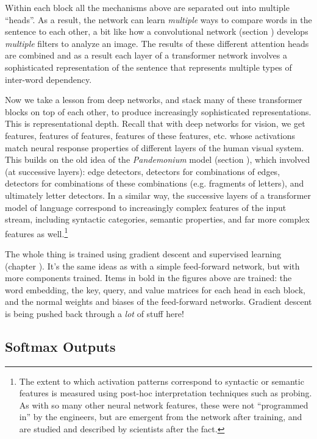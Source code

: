 Within each block all the mechanisms above are separated out into multiple ``heads''. As a result, the network can learn \emph{multiple} ways to compare words in the sentence to each other, a bit like how a convolutional network (section ) develops \emph{multiple} filters to analyze an image.  The results of these different attention heads are combined and as a result each layer of a transformer network involves a sophisticated representation of the sentence that represents multiple types of inter-word dependency.
 
Now we take a lesson from deep networks, and stack many of these transformer blocks on top of each other, to produce increasingly sophisticated representations. This is representational depth. Recall that with deep networks for vision, we get features, features of features, features of these features, etc. whose activations match neural response properties of different layers of the human visual system. This builds on the old idea of the \emph{Pandemonium} model (section ), which involved (at successive layers): edge detectors, detectors for combinations of edges, detectors for combinations of these combinations (e.g. fragments of letters), and ultimately letter detectors. In a similar way, the successive layers of a transformer model of language correspond to increasingly complex features of the input stream, including syntactic categories, semantic properties, and far more complex features as well.\footnote{The extent to which activation patterns correspond to syntactic or semantic features is measured using post-hoc interpretation techniques such as probing. As with so many other neural network features, these were not ``programmed in'' by the engineers, but are emergent from the network after training, and are studied and described by scientists after the fact.}

The whole thing is trained using gradient descent and supervised learning (chapter ). It's the same ideas as with a simple feed-forward network, but with more components trained. Items in bold in the figures above are trained: the word embedding, the key, query, and value matrices for each head in each block, and the normal weights and biases of the feed-forward networks.  Gradient descent is being pushed back through a \emph{lot} of stuff here!

\subsection{Softmax Outputs}\label{llmOutput}

